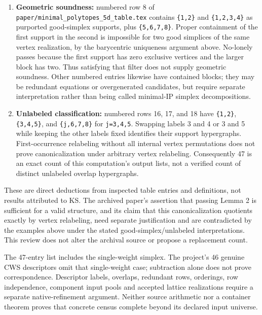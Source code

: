 \documentclass[11pt,a4paper,oneside]{report}
\providecommand{\tightlist}{%
  \setlength{\itemsep}{0pt}\setlength{\parskip}{0pt}}
\begin{document}
\begin{enumerate}
\def\labelenumi{\arabic{enumi}.}
\tightlist
\item
  \textbf{Geometric soundness:} numbered row 8 of
  \texttt{paper/\allowbreak{}minimal\_\allowbreak{}polytope\allowbreak{}s\_\allowbreak{}5d\_\allowbreak{}table.\allowbreak{}tex}
  contains \texttt{\{1,\allowbreak{}2\}} and
  \texttt{\{1,\allowbreak{}2,\allowbreak{}3,\allowbreak{}4\}} as
  purported good-simplex supports, plus
  \texttt{\{5,\allowbreak{}6,\allowbreak{}7,\allowbreak{}8\}}. Proper
  containment of the first support in the second is impossible for two
  good simplices of the same vertex realization, by the barycentric
  uniqueness argument above. No-lonely passes because the first support
  has zero exclusive vertices and the larger block has two. Thus
  satisfying that filter does not supply geometric soundness. Other
  numbered entries likewise have contained blocks; they may be redundant
  equations or overgenerated candidates, but require separate
  interpretation rather than being called minimal-IP simplex
  decompositions.
\item
  \textbf{Unlabeled classification:} numbered rows 16, 17, and 18 have
  \texttt{\{1,\allowbreak{}2\}},
  \texttt{\{3,\allowbreak{}4,\allowbreak{}5\}}, and
  \texttt{\{j,\allowbreak{}6,\allowbreak{}7,\allowbreak{}8\}} for
  \texttt{j=\allowbreak{}3,\allowbreak{}4,\allowbreak{}5}. Swapping
  labels 3 and 4 or 3 and 5 while keeping the other labels fixed
  identifies their support hypergraphs. First-occurrence relabeling
  without all internal vertex permutations does not prove
  canonicalization under arbitrary vertex relabeling. Consequently 47 is
  an exact count of this computation's output lists, not a verified
  count of distinct unlabeled overlap hypergraphs.
\end{enumerate}

These are direct deductions from inspected table entries and
definitions, not results attributed to KS. The archived paper's
assertion that passing Lemma 2 is sufficient for a valid structure, and
its claim that this canonicalization quotients exactly by vertex
relabeling, need separate justification and are contradicted by the
examples above under the stated good-simplex/unlabeled interpretations.
This review does not alter the archival source or propose a replacement
count.

The 47-entry list includes the single-weight simplex. The project's 46
genuine CWS descriptors omit that single-weight case; subtraction alone
does not prove correspondence. Descriptor labels, overlaps, redundant
rows, orderings, row independence, component input pools and accepted
lattice realizations require a separate native-refinement argument.
Neither source arithmetic nor a container theorem proves that concrete
census complete beyond its declared input universe.
\end{document}
